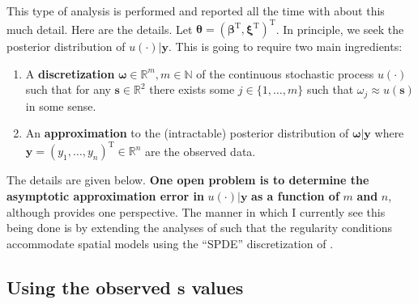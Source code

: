 \documentclass[12pt]{article}
\newcommand{\Nats}{\mathbb{N}}
\newcommand{\Reals}{\mathbb{R}}
\newcommand{\mb}[1]{\boldsymbol{#1}}
\newcommand{\Tr}{^{\textrm{T}}}
\newcommand{\params}{\mb{\theta}}
\newcommand{\response}{\mb{y}}
\begin{document}
This type of analysis is performed and reported all the time with about this much detail.
Here are the details. Let $\params = (\mb{\beta}\Tr, \mb{\xi}\Tr)\Tr$.
In principle, we seek the posterior distribution of $u(\cdot)|\response$.
This is going to require two main ingredients:
\begin{enumerate}
  \item A \textbf{discretization} $\mb{\omega}\in\Reals^m, m\in\Nats$ of the continuous stochastic process $u(\cdot)$ such that for 
  any $\mb{s}\in\Reals^2$ there exists some $j\in\{1,\ldots,m\}$ such that $\omega_j \approx u(\mb{s})$ in some sense.
  \item An \textbf{approximation} to the (intractable) posterior distribution of $\mb{\omega}|\response$ where $\response = (y_1,\ldots,y_n)\Tr\in\Reals^n$ are the observed data.
\end{enumerate}
The details are given below. \textbf{One open problem is to determine the asymptotic approximation error in} $u(\cdot)|\response$ \textbf{as a function of} $m$ \textbf{and} $n$, although \citet{sanz2022finite} provides one perspective.
The manner in which I currently see this being done is by extending the analyses of \citet{bilodeau2024stochastic,stringer2022asymptotics}
such that the regularity conditions accommodate spatial models using the ``SPDE'' discretization of \citet{spde,sanz2022finite}.

\subsection{Using the observed $\mb{s}$ values}
\end{document}
